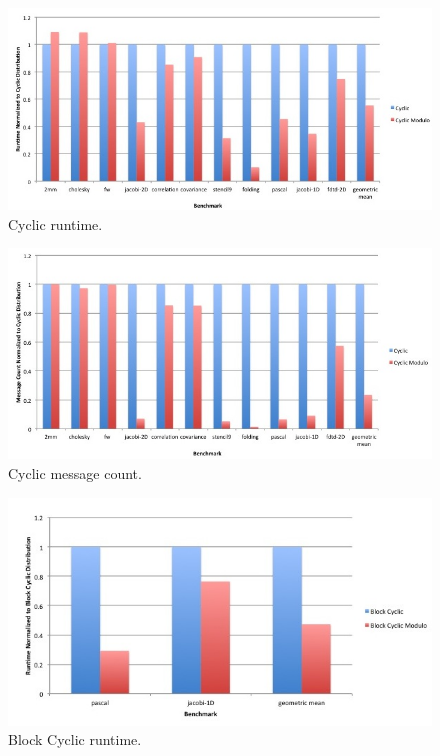 \begin{figure}
	\begin{center}
	\includegraphics[scale=0.30]{./Figures/cyclic_runtime}
	\caption{Cyclic runtime.}
	\label{cyclic_runtime}
	\end{center}
\end{figure}

\begin{figure}
	\begin{center}
	\includegraphics[scale=0.30]{./Figures/cyclic_message_count}
	\caption{Cyclic message count.}
	\label{cyclic_message_count}
	\end{center}
\end{figure}

\begin{figure}
	\begin{center}
	\includegraphics[scale=0.30]{./Figures/block_cyclic_runtime}
	\caption{Block Cyclic runtime.}
	\label{block_cyclic_runtime}
	\end{center}
\end{figure}

